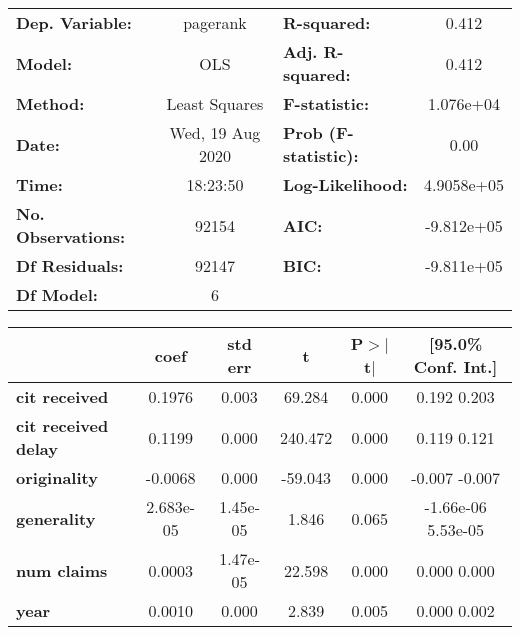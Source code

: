 \begin{center}
\begin{tabular}{lclc}
\toprule
\textbf{Dep. Variable:}     &     pagerank     & \textbf{  R-squared:         } &       0.412    \\
\textbf{Model:}             &       OLS        & \textbf{  Adj. R-squared:    } &       0.412    \\
\textbf{Method:}            &  Least Squares   & \textbf{  F-statistic:       } &   1.076e+04    \\
\textbf{Date:}              & Wed, 19 Aug 2020 & \textbf{  Prob (F-statistic):} &       0.00     \\
\textbf{Time:}              &     18:23:50     & \textbf{  Log-Likelihood:    } &   4.9058e+05   \\
\textbf{No. Observations:}  &       92154      & \textbf{  AIC:               } &   -9.812e+05   \\
\textbf{Df Residuals:}      &       92147      & \textbf{  BIC:               } &   -9.811e+05   \\
\textbf{Df Model:}          &           6      & \textbf{                     } &                \\
\bottomrule
\end{tabular}
\begin{tabular}{lccccc}
                            & \textbf{coef} & \textbf{std err} & \textbf{t} & \textbf{P$>$$|$t$|$} & \textbf{[95.0\% Conf. Int.]}  \\
\midrule
\textbf{cit received}       &       0.1976  &        0.003     &    69.284  &         0.000        &         0.192     0.203       \\
\textbf{cit received delay} &       0.1199  &        0.000     &   240.472  &         0.000        &         0.119     0.121       \\
\textbf{originality}        &      -0.0068  &        0.000     &   -59.043  &         0.000        &        -0.007    -0.007       \\
\textbf{generality}         &    2.683e-05  &     1.45e-05     &     1.846  &         0.065        &     -1.66e-06  5.53e-05       \\
\textbf{num claims}         &       0.0003  &     1.47e-05     &    22.598  &         0.000        &         0.000     0.000       \\
\textbf{year}               &       0.0010  &        0.000     &     2.839  &         0.005        &         0.000     0.002       \\

\end{tabular}
\end{center}
